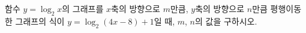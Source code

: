 함수 $y=\log_2 x$의 그래프를 $x$축의 방향으로 \mbox{$m$만큼}, $y$축의 방향으로 $n$만큼 평행이동한 그래프의 식이 $y=\log_2 (4x-8)+1$일 때, $m$, $n$의 값을 구하시오.
